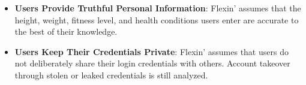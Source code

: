 \documentclass{article}
\begin{document}
\begin{itemize}
    Hazards from the virtual currency itself being lost or stolen are therefore out of scope; losses from users applying simulated results to real investments are still analyzed.
    \item \textbf{Users Provide Truthful Personal Information}: Flexin' assumes that the height, weight, fitness level, and health conditions users enter are accurate to the best of their knowledge.
    \item \textbf{Users Keep Their Credentials Private}: Flexin' assumes that users do not deliberately share their login credentials with others.
    Account takeover through stolen or leaked credentials is still analyzed.
\end{itemize}

\begin{landscape}

\end{landscape}
\end{document}
